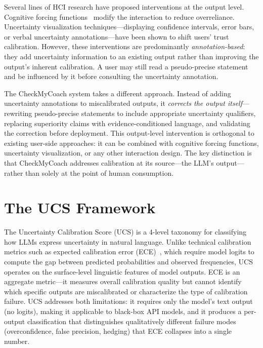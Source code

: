 \documentclass[manuscript, review, anonymous]{acmart}
\begin{document}
Several lines of HCI research have proposed interventions at the output level. Cognitive forcing functions~\cite{bucinca2021trust} modify the interaction to reduce overreliance. Uncertainty visualization techniques---displaying confidence intervals, error bars, or verbal uncertainty annotations---have been shown to shift users' trust calibration. However, these interventions are predominantly \emph{annotation-based}: they add uncertainty information to an existing output rather than improving the output's inherent calibration. A user may still read a pseudo-precise statement and be influenced by it before consulting the uncertainty annotation.

The CheckMyCoach system takes a different approach. Instead of adding uncertainty annotations to miscalibrated outputs, it \emph{corrects the output itself}---rewriting pseudo-precise statements to include appropriate uncertainty qualifiers, replacing superiority claims with evidence-conditioned language, and validating the correction before deployment. This output-level intervention is orthogonal to existing user-side approaches: it can be combined with cognitive forcing functions, uncertainty visualization, or any other interaction design. The key distinction is that CheckMyCoach addresses calibration at its source---the LLM's output---rather than solely at the point of human consumption.

\section{The UCS Framework}
\label{sec:ucs}

The Uncertainty Calibration Score (UCS) is a 4-level taxonomy for classifying how LLMs express uncertainty in natural language. Unlike technical calibration metrics such as expected calibration error (ECE)~\cite{guo2017calibration}, which require model logits to compute the gap between predicted probabilities and observed frequencies, UCS operates on the surface-level linguistic features of model outputs. ECE is an aggregate metric—it measures overall calibration quality but cannot identify which specific outputs are miscalibrated or characterize the type of calibration failure. UCS addresses both limitations: it requires only the model's text output (no logits), making it applicable to black-box API models, and it produces a per-output classification that distinguishes qualitatively different failure modes (overconfidence, false precision, hedging) that ECE collapses into a single number.
\end{document}
